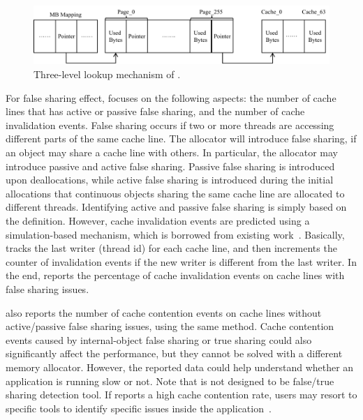           
\begin{figure}[!h]
\centering
\includegraphics[width=0.9\columnwidth]{figures/lookup}
\caption{Three-level lookup mechanism of \MP{}.\label{fig:lookup}}
\end{figure}


For false sharing effect, \MP{} focuses on the following aspects: the number of cache lines that has active or passive false sharing, and the number of cache invalidation events. False sharing occurs if two or more threads are accessing different parts of the same cache line. The allocator will introduce false sharing, if an object may share a cache line with others. In particular, the allocator may introduce passive and active false sharing. Passive false sharing is introduced upon deallocations, while active false sharing is introduced during the initial allocations that continuous objects sharing the same cache line are allocated to different threads. Identifying active and passive false sharing is simply based on the definition. However, cache invalidation events are predicted using a simulation-based mechanism, which is borrowed from existing work~\cite{Cheetah}. Basically, \MP{} tracks the last writer (thread id) for each cache line, and then increments the counter of invalidation events if the new writer is different from the last writer. 
In the end, \MP{} reports the percentage of cache invalidation events on cache lines with false sharing issues. 

\MP{} also reports the number of cache contention events on cache lines without active/passive false sharing issues, using the same method. Cache contention events caused by internal-object false sharing or true sharing could also significantly affect the performance, but they cannot be solved with a different memory allocator. However, the reported data could help understand whether an application is running slow or not. Note that \MP{} is not designed to be false/true sharing detection tool. If \MP{} reports a high cache contention rate, users may resort to specific tools to identify specific issues inside the application~\cite{Sheriff, Predator, DBLP:conf/ppopp/ChabbiWL18}. 
   

